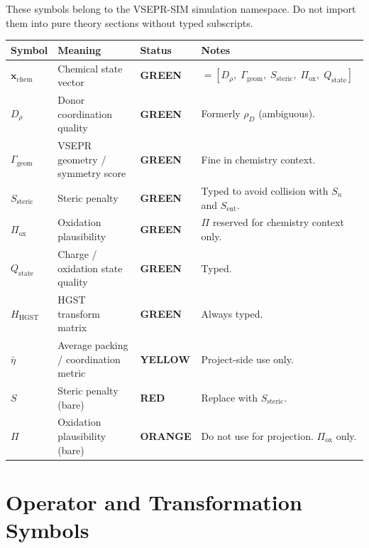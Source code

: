 \documentclass[11pt, a4paper, oneside]{article}
\newcommand{\GRN}{\colorbox{GreenBG}{\textcolor{GreenFG}{\small\bfseries GREEN}}}
\newcommand{\YEL}{\colorbox{YellowBG}{\textcolor{YellowFG}{\small\bfseries YELLOW}}}
\newcommand{\ORG}{\colorbox{OrangeBG}{\textcolor{OrangeFG}{\small\bfseries ORANGE}}}
\newcommand{\RED}{\colorbox{RedBG}{\textcolor{RedFG}{\small\bfseries RED}}}
\begin{document}
\noindent These symbols belong to the VSEPR-SIM simulation namespace.
Do not import them into pure theory sections without typed subscripts.

\begin{longtable}{C{2.3cm} L{4.3cm} C{1.5cm} L{5cm}}
  \toprule
  \textbf{Symbol} & \textbf{Meaning} & \textbf{Status} & \textbf{Notes} \\
  \midrule
  \endhead
  $\mathbf{x}_{\mathrm{chem}}$ & Chemical state vector & \GRN &
    $= [D_\rho,\; \Gamma_{\mathrm{geom}},\; S_{\mathrm{steric}},\;
       \Pi_{\mathrm{ox}},\; Q_{\mathrm{state}}]$ \\[4pt]
  $D_\rho$ & Donor coordination quality & \GRN &
    Formerly $\rho_D$ (ambiguous). \\[4pt]
  $\Gamma_{\mathrm{geom}}$ & VSEPR geometry / symmetry score & \GRN &
    Fine in chemistry context. \\[4pt]
  $S_{\mathrm{steric}}$ & Steric penalty & \GRN &
    Typed to avoid collision with $S_n$ and $S_{\mathrm{ent}}$. \\[4pt]
  $\Pi_{\mathrm{ox}}$ & Oxidation plausibility & \GRN &
    $\Pi$ reserved for chemistry context only. \\[4pt]
  $Q_{\mathrm{state}}$ & Charge / oxidation state quality & \GRN &
    Typed. \\[4pt]
  $H_{\mathrm{HGST}}$ & HGST transform matrix & \GRN &
    Always typed. \\[4pt]
  $\bar{\eta}$ & Average packing / coordination metric & \YEL &
    Project-side use only. \\[4pt]
  $S$ & Steric penalty (bare) & \RED &
    Replace with $S_{\mathrm{steric}}$. \\[4pt]
  $\Pi$ & Oxidation plausibility (bare) & \ORG &
    Do not use for projection. $\Pi_{\mathrm{ox}}$ only. \\[4pt]
  \bottomrule
\end{longtable}

\section{Operator and Transformation Symbols}
\label{sec:operators}
\end{document}
